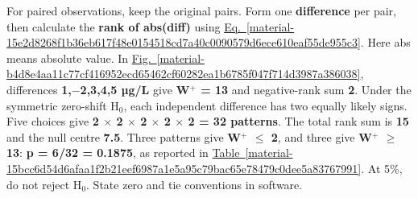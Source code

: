 \documentclass[11pt,a4paper]{article}
\begin{document}
For paired observations, keep the original pairs. Form one \textbf{difference} per pair, then calculate the \textbf{rank of abs(diff)} using \hyperref[material-15e2d8268f1b36eb617f48e0154518cd7a40c0090579d6ece610eaf55de955c3]{Eq.~\ref*{material-15e2d8268f1b36eb617f48e0154518cd7a40c0090579d6ece610eaf55de955c3}}. Here abs means absolute value. In \hyperref[material-b4d8e4aa11c77cf416952ecd65462cf60282ea1b6785f047f714d3987a386038]{Fig.~\ref*{material-b4d8e4aa11c77cf416952ecd65462cf60282ea1b6785f047f714d3987a386038}}, differences \textbf{1,\ensuremath{-}2,3,4,5 µg/L} give \textbf{W\ensuremath{{}^+} = 13} and negative-rank sum \textbf{2}. Under the symmetric zero-shift H\ensuremath{{}_0}, each independent difference has two equally likely signs. Five choices give \textbf{2 \ensuremath{\times} 2 \ensuremath{\times} 2 \ensuremath{\times} 2 \ensuremath{\times} 2 = 32 patterns}. The total rank sum is \textbf{15} and the null centre \textbf{7.5}. Three patterns give \textbf{W\ensuremath{{}^+} \ensuremath{\le} 2}, and three give \textbf{W\ensuremath{{}^+} \ensuremath{\ge} 13}: \textbf{p = 6/32 = 0.1875}, as reported in \hyperref[material-15bcc6d54d6afaa1f2b21eef6987a1e5a95c79bac65e78479c0dee5a83767991]{Table~\ref*{material-15bcc6d54d6afaa1f2b21eef6987a1e5a95c79bac65e78479c0dee5a83767991}}. At 5\%, do not reject H\ensuremath{{}_0}. State zero and tie conventions in software.
\end{document}
